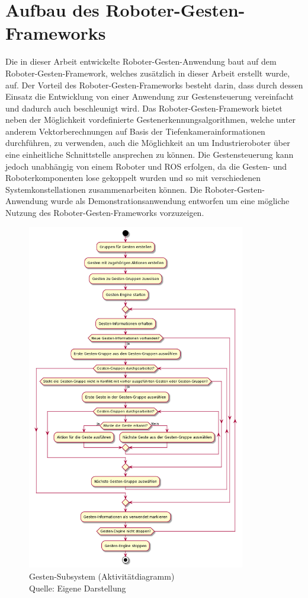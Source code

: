 \section{Aufbau des Roboter-Gesten-Frameworks}
Die in dieser Arbeit entwickelte Roboter-Gesten-Anwendung baut auf dem Roboter-Gesten-Framework, welches zusätzlich in dieser Arbeit erstellt wurde, auf. Der Vorteil des Roboter-Gesten-Frameworks besteht darin, dass durch dessen Einsatz die Entwicklung von einer Anwendung zur Gestensteuerung vereinfacht und dadurch auch beschleunigt wird. Das Roboter-Gesten-Framework bietet neben der Möglichkeit vordefinierte Gestenerkennungsalgorithmen, welche unter anderem Vektorberechnungen auf Basis der Tiefenkamerainformationen durchführen, zu verwenden, auch die Möglichkeit an um Industrieroboter über eine einheitliche Schnittstelle ansprechen zu können. Die Gestensteuerung kann jedoch unabhängig von einem Roboter und ROS erfolgen, da die Gesten- und Roboterkomponenten lose gekoppelt wurden und so mit verschiedenen Systemkonstellationen zusammenarbeiten können. Die Roboter-Gesten-Anwendung wurde als Demonstrationsanwendung entworfen um eine mögliche Nutzung des Roboter-Gesten-Frameworks vorzuzeigen.

\begin{figure}[htb]
	\centering
	\includegraphics[width=0.85\textwidth]{images/loesungsweg/gesture_subsystem_uml}
	\caption[Gesten-Subsystem (Aktivitätdiagramm)]{Gesten-Subsystem (Aktivitätdiagramm)\\Quelle: Eigene Darstellung}
	\label{fig:gesture_subsystem_uml}
\end{figure}
\FloatBarrier

